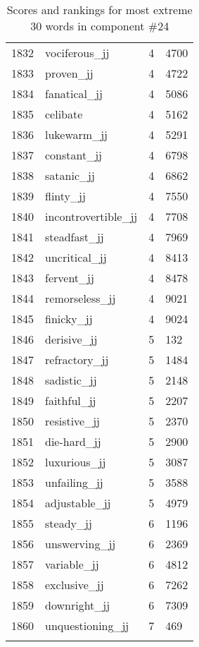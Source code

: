 \begin{longtable}[!htbp]{| rlr@{.}l |}
    1832 & vociferous\_jj & 4 & 4700 \\
    1833 & proven\_jj & 4 & 4722 \\
    1834 & fanatical\_jj & 4 & 5086 \\
    1835 & celibate & 4 & 5162 \\
    1836 & lukewarm\_jj & 4 & 5291 \\
    1837 & constant\_jj & 4 & 6798 \\
    1838 & satanic\_jj & 4 & 6862 \\
    1839 & flinty\_jj & 4 & 7550 \\
    1840 & incontrovertible\_jj & 4 & 7708 \\
    1841 & steadfast\_jj & 4 & 7969 \\
    1842 & uncritical\_jj & 4 & 8413 \\
    1843 & fervent\_jj & 4 & 8478 \\
    1844 & remorseless\_jj & 4 & 9021 \\
    1845 & finicky\_jj & 4 & 9024 \\
    1846 & derisive\_jj & 5 & 132 \\
    1847 & refractory\_jj & 5 & 1484 \\
    1848 & sadistic\_jj & 5 & 2148 \\
    1849 & faithful\_jj & 5 & 2207 \\
    1850 & resistive\_jj & 5 & 2370 \\
    1851 & die-hard\_jj & 5 & 2900 \\
    1852 & luxurious\_jj & 5 & 3087 \\
    1853 & unfailing\_jj & 5 & 3588 \\
    1854 & adjustable\_jj & 5 & 4979 \\
    1855 & steady\_jj & 6 & 1196 \\
    1856 & unswerving\_jj & 6 & 2369 \\
    1857 & variable\_jj & 6 & 4812 \\
    1858 & exclusive\_jj & 6 & 7262 \\
    1859 & downright\_jj & 6 & 7309 \\
    1860 & unquestioning\_jj & 7 & 469 \\
    \hline
    \caption{Scores and rankings for most extreme 30 words in component \#24} \\
\end{longtable}
